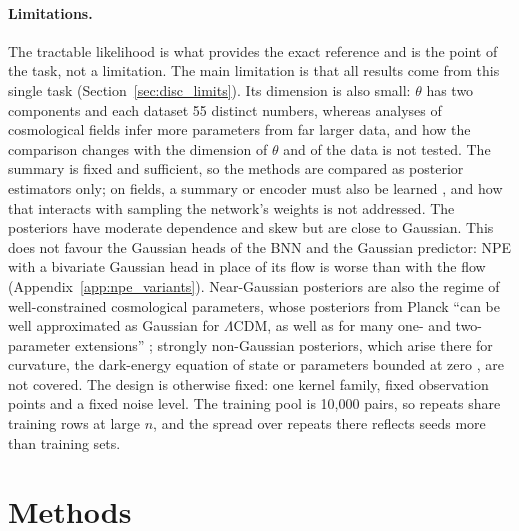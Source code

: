 \documentclass[11pt]{article}
\begin{document}
\paragraph{Limitations.}
The tractable likelihood is what provides the exact reference and is the point of the task, not a limitation. The
main limitation is that all results come from this single task (Section~\ref{sec:disc_limits}). Its dimension is also
small: $\theta$ has two components and each dataset 55 distinct numbers, whereas analyses of
cosmological fields infer more parameters from far larger data, and how the comparison changes with the dimension
of $\theta$ and of the data is not tested. The summary is fixed and sufficient, so the methods are compared as
posterior estimators only; on fields, a summary or encoder must also be learned \citep{makinen2021lossless}, and how
that interacts with sampling the network's weights is not addressed. The posteriors have moderate dependence and
skew but are close to Gaussian. This does not favour the Gaussian heads of the BNN and the Gaussian predictor: NPE
with a bivariate Gaussian head in place of its flow is worse than with the flow (Appendix~\ref{app:npe_variants}).
Near-Gaussian posteriors are also the regime of well-constrained cosmological parameters, whose posteriors from Planck ``can be well
approximated as Gaussian for $\Lambda$CDM, as well as for many one- and two-parameter extensions''
\citep{huang2019correlations}; strongly non-Gaussian posteriors, which arise there for curvature, the dark-energy
equation of state or parameters bounded at zero \citep{huang2019correlations}, are not covered. The design is otherwise fixed: one kernel
family, fixed observation points and a fixed noise level. The training pool is 10{,}000 pairs, so repeats share
training rows at large $n$, and the spread over repeats there reflects seeds more than training sets.

\section{Methods}
\label{sec:methods}
\end{document}
